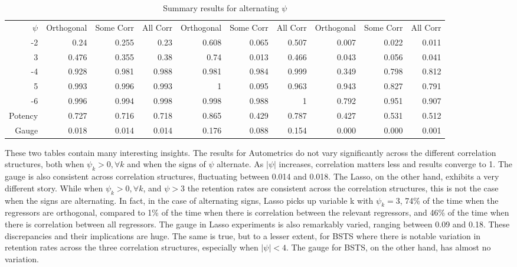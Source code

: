 \documentclass[11pt, oneside]{book}   	%
\begin{document}
\begin{landscape}
\begin{table}[htbp]
\begin{tabular}{rrrrrrrrrr}
    $\psi$ & Orthogonal & Some Corr & All Corr & Orthogonal & Some Corr & All Corr & Orthogonal  & Some Corr & All Corr \\
    -2    & 0.24  & 0.255 & 0.23  & 0.608 & 0.065 & 0.507 & 0.007 & 0.022 & 0.011 \\
    3     & 0.476 & 0.355 & 0.38  & 0.74  & 0.013 & 0.466 & 0.043 & 0.056 & 0.041 \\
    -4    & 0.928 & 0.981 & 0.988 & 0.981 & 0.984 & 0.999 & 0.349 & 0.798 & 0.812 \\
    5     & 0.993 & 0.996 & 0.993 & 1     & 0.095 & 0.963 & 0.943 & 0.827 & 0.791 \\
    -6    & 0.996 & 0.994 & 0.998 & 0.998 & 0.988 & 1     & 0.792 & 0.951 & 0.907 \\
    Potency & 0.727 & 0.716 & 0.718 & 0.865 & 0.429 & 0.787 & 0.427 & 0.531 & 0.512 \\
    Gauge & 0.018 & 0.014 & 0.014 & 0.176 & 0.088 & 0.154 & 0.000 & 0.000 & 0.001 \\

    \end{tabular}%
  
    \caption{Summary results for alternating $\psi$}
    \label{tab:SummaryAlt}%
\end{table}%

\end{landscape}

These two tables contain many interesting insights. The results for Autometrics do not vary significantly across the different correlation structures, both when $\psi_{k}>0,\forall k$ and when the signs of $\psi$ alternate. As $|\psi|$ increases, correlation matters less and results converge to 1. The gauge is also consistent across correlation structures, fluctuating between 0.014 and 0.018.  The Lasso, on the other hand, exhibits a very different story. While when $\psi_{k}>0, \forall k$, and $\psi>3$ the retention rates are consistent across the correlation structures, this is not the case when the signs are alternating. In fact, in the case of alternating signs, Lasso picks up variable k with $\psi_{k}=3$, 74\% of the time when the regressors are orthogonal, compared to 1\% of the time when there is correlation between the relevant regressors, and 46\% of the time when there is correlation between all regressors. The gauge in Lasso experiments is also remarkably varied, ranging between 0.09 and 0.18. These discrepancies and their implications are huge. The same is true, but to a lesser extent, for BSTS where there is notable variation in retention rates across the three correlation structures, especially when $|\psi|<4$. The gauge for BSTS, on the other hand, has almost no variation.
\end{document}
